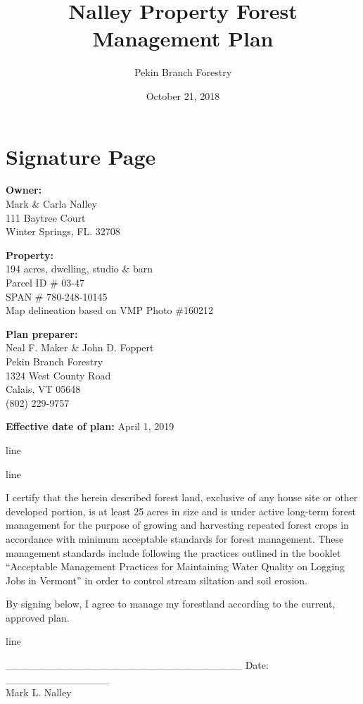 \documentclass[]{tufte-handout}
\title{Nalley Property Forest Management Plan}
\author{Pekin Branch Forestry}
\date{October 21, 2018}
\begin{document}
\maketitle




\section{Signature Page}\label{signature-page}

\textbf{Owner:}\\
Mark \& Carla Nalley\\
111 Baytree Court\\
Winter Springs, FL. 32708

\textbf{Property:}\\
194 acres, dwelling, studio \& barn\\
Parcel ID \# 03-47\\
SPAN \# 780-248-10145\\
Map delineation based on VMP Photo \#160212

\textbf{Plan preparer:}\\
Neal F. Maker \& John D. Foppert\\
Pekin Branch Forestry\\
1324 West County Road\\
Calais, VT 05648\\
(802) 229-9757

\textbf{Effective date of plan:} April 1, 2019

line

line

I certify that the herein described forest land, exclusive of any house
site or other developed portion, is at least 25 acres in size and is
under active long-term forest management for the purpose of growing and
harvesting repeated forest crops in accordance with minimum acceptable
standards for forest management. These management standards include
following the practices outlined in the booklet ``Acceptable Management
Practices for Maintaining Water Quality on Logging Jobs in Vermont'' in
order to control stream siltation and soil erosion.

By signing below, I agree to manage my forestland according to the
current, approved plan.

line

\_\_\_\_\_\_\_\_\_\_\_\_\_\_\_\_\_\_\_\_\_\_\_\_\_\_\_\_\_\_\_\_ Date:
\_\_\_\_\_\_\_\_\_\_\_\_\_\_\\
Mark L. Nalley
\end{document}
